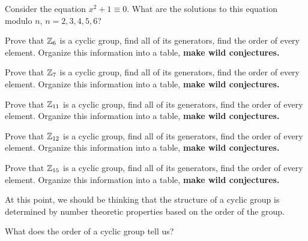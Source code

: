 \documentclass{ximera}
\begin{document}
\begin{exercise}
  Consider the equation $x^2+1 \equiv 0$. What are the solutions to this
  equation modulo $n$, $n=2,3,4,5,6$?
\end{exercise}


\begin{exercise}
  Prove that $\mathbb Z_{6}$ is a cyclic group, find all of its generators,
  find the order of every element. Organize this information into a
  table, \textbf{make wild conjectures.}
\end{exercise}

\begin{exercise}
  Prove that $\mathbb Z_{7}$ is a cyclic group, find all of its generators,
  find the order of every element. Organize this information into a
  table, \textbf{make wild conjectures.}
\end{exercise}


\begin{exercise}
  Prove that $\mathbb Z_{11}$ is a cyclic group, find all of its generators,
  find the order of every element. Organize this information into a
  table, \textbf{make wild conjectures.}
\end{exercise}



\begin{exercise}
  Prove that $\mathbb Z_{12}$ is a cyclic group, find all of its generators,
  find the order of every element. Organize this information into a
  table, \textbf{make wild conjectures.}
\end{exercise}


\begin{exercise}
  Prove that $\mathbb Z_{15}$ is a cyclic group, find all of its generators,
  find the order of every element. Organize this information into a
  table, \textbf{make wild conjectures.}
\end{exercise}


At this point, we should be thinking that the structure of a cyclic
group is determined by number theoretic properties based on the order
of the group.


\begin{question}
  What does the order of a cyclic group tell us?
\end{question}
\end{document}
